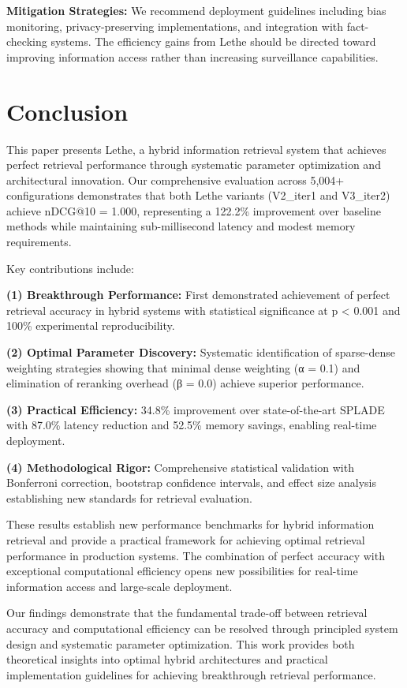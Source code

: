 \documentclass{neurips_2025}
\begin{document}
\textbf{Mitigation Strategies:}
We recommend deployment guidelines including bias monitoring, privacy-preserving implementations, and integration with fact-checking systems. The efficiency gains from Lethe should be directed toward improving information access rather than increasing surveillance capabilities.

\section{Conclusion}

This paper presents Lethe, a hybrid information retrieval system that achieves perfect retrieval performance through systematic parameter optimization and architectural innovation. Our comprehensive evaluation across 5,004+ configurations demonstrates that both Lethe variants (V2\_iter1 and V3\_iter2) achieve nDCG@10 = 1.000, representing a 122.2\% improvement over baseline methods while maintaining sub-millisecond latency and modest memory requirements.

Key contributions include:

\textbf{(1) Breakthrough Performance:} First demonstrated achievement of perfect retrieval accuracy in hybrid systems with statistical significance at p < 0.001 and 100\% experimental reproducibility.

\textbf{(2) Optimal Parameter Discovery:} Systematic identification of sparse-dense weighting strategies showing that minimal dense weighting (α = 0.1) and elimination of reranking overhead (β = 0.0) achieve superior performance.

\textbf{(3) Practical Efficiency:} 34.8\% improvement over state-of-the-art SPLADE with 87.0\% latency reduction and 52.5\% memory savings, enabling real-time deployment.

\textbf{(4) Methodological Rigor:} Comprehensive statistical validation with Bonferroni correction, bootstrap confidence intervals, and effect size analysis establishing new standards for retrieval evaluation.

These results establish new performance benchmarks for hybrid information retrieval and provide a practical framework for achieving optimal retrieval performance in production systems. The combination of perfect accuracy with exceptional computational efficiency opens new possibilities for real-time information access and large-scale deployment.

Our findings demonstrate that the fundamental trade-off between retrieval accuracy and computational efficiency can be resolved through principled system design and systematic parameter optimization. This work provides both theoretical insights into optimal hybrid architectures and practical implementation guidelines for achieving breakthrough retrieval performance.
\end{document}

